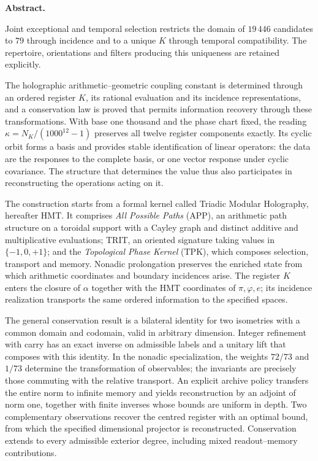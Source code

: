 \noindent\textbf{Abstract.}\par\smallskip
Joint exceptional and temporal selection restricts the domain of \(19\,446\) candidates to \(79\) through incidence and to a unique \(K\) through temporal compatibility. The repertoire, orientations and filters producing this uniqueness are retained explicitly.

The holographic arithmetic--geometric coupling constant is determined through an ordered register \(K\), its rational evaluation and its incidence representations, and a conservation law is proved that permits information recovery through these transformations. With base one thousand and the phase chart fixed, the reading \(\kappa=N_K/(1000^{12}-1)\) preserves all twelve register components exactly. Its cyclic orbit forms a basis and provides stable identification of linear operators: the data are the responses to the complete basis, or one vector response under cyclic covariance. The structure that determines the value thus also participates in reconstructing the operations acting on it.

The construction starts from a formal kernel called Triadic Modular Holography, hereafter HMT. It comprises \emph{All Possible Paths} (APP), an arithmetic path structure on a toroidal support with a Cayley graph and distinct additive and multiplicative evaluations; TRIT, an oriented signature taking values in \(\{-1,0,+1\}\); and the \emph{Topological Phase Kernel} (TPK), which composes selection, transport and memory. Nonadic prolongation preserves the enriched state from which arithmetic coordinates and boundary incidences arise. The register \(K\) enters the closure of \(\alpha\) together with the HMT coordinates of \(\pi,\varphi,e\); its incidence realization transports the same ordered information to the specified spaces.

The general conservation result is a bilateral identity for two isometries with a common domain and codomain, valid in arbitrary dimension. Integer refinement with carry has an exact inverse on admissible labels and a unitary lift that composes with this identity. In the nonadic specialization, the weights \(72/73\) and \(1/73\) determine the transformation of observables; the invariants are precisely those commuting with the relative transport. An explicit archive policy transfers the entire norm to infinite memory and yields reconstruction by an adjoint of norm one, together with finite inverses whose bounds are uniform in depth. Two complementary observations recover the centred register with an optimal bound, from which the specified dimensional projector is reconstructed. Conservation extends to every admissible exterior degree, including mixed readout--memory contributions.

